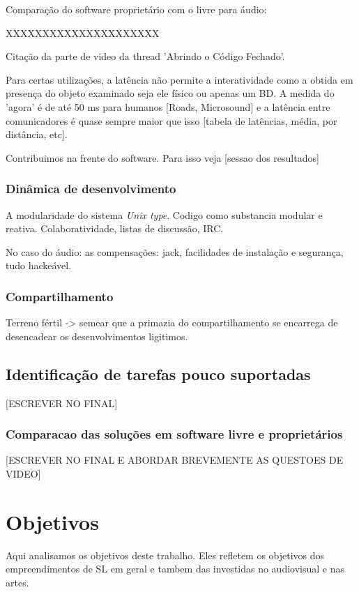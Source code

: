 Comparação do software proprietário com o livre para áudio:

XXXXXXXXXXXXXXXXXXXXX

Citação da parte de video da thread 'Abrindo o Código Fechado'.

Para certas utilizações, a latência não permite a interatividade como 
a obtida em presença do objeto examinado seja ele físico ou apenas um BD.
A medida do 'agora' é de até 50 ms para humanos [Roads, Microsound] e a latência entre comunicadores é
quase sempre maior que isso [tabela de latências, média, por distância, etc].

Contribuimos na frente do software. Para isso veja [sessao dos resultados]


    \subsubsection{Dinâmica de desenvolvimento}
    \label{sec:din_dev}
A modularidade do sistema \emph{Unix type}. Codigo como substancia modular
e reativa. Colaboratividade, listas de discussão, IRC.

No caso do áudio: as compensações: jack,
facilidades de instalação e segurança, tudo hackeável.

    \subsubsection{Compartilhamento}
    \label{sec:comp_tec}
Terreno fértil -> semear que a primazia do compartilhamento se encarrega de
desencadear os desenvolvimentos ligitimos.

    \subsection{Identificação de tarefas pouco suportadas}
    \label{sec:tarefas_n_sup}
[ESCREVER NO FINAL]

    \subsubsection{Comparacao das soluções em software livre e proprietários}
    \label{sec:sl_prop}
[ESCREVER NO FINAL E ABORDAR BREVEMENTE AS QUESTOES DE VIDEO]


\section{Objetivos}
\label{sec:objetivos}
Aqui analisamos os objetivos deste trabalho. Eles refletem os objetivos
dos empreendimentos de SL em geral e tambem das investidas no audiovisual e nas artes.

